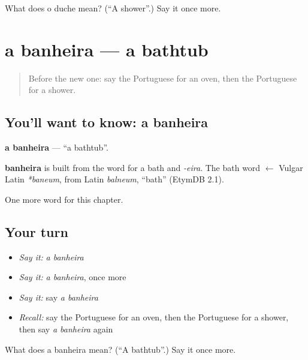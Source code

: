 \begin{tcolorbox}[breakable,colback=teal!4,colframe=teal!35!black,title={Before you move on}]
What does o duche mean? (\textquotedblleft{}A shower\textquotedblright{}.) Say it once more.
\end{tcolorbox}
\section[a banheira]{a banheira — a bathtub}

\label{lesson:PT-C94-banheira}



\begin{quote}
Before the new one: say the Portuguese for an oven, then the Portuguese for a shower.
\end{quote}

\subsection*{You'll want to know: a banheira}
\textbf{a banheira} — \textquotedblleft{}a bathtub\textquotedblright{}.

\begin{cousinweb}
\textbf{banheira} is built from the word for a bath and \emph{-eira}. The bath word $\leftarrow$ Vulgar Latin \emph{*baneum}, from Latin \emph{balneum}, \textquotedblleft{}bath\textquotedblright{} (EtymDB 2.1).
\end{cousinweb}

\begin{grammarlens}[title={What you've built}]
One more word for this chapter.
\end{grammarlens}

\subsection*{Your turn}
\begin{itemize}
\raggedright
  \item \emph{Say it:} \emph{a banheira}
  \item \emph{Say it:} \emph{a banheira}, once more
  \item \emph{Say it:} say \emph{a banheira}
  \item \emph{Recall:} say the Portuguese for an oven, then the Portuguese for a shower, then say \emph{a banheira} again
\end{itemize}

\begin{tcolorbox}[breakable,colback=teal!4,colframe=teal!35!black,title={Before you move on}]
What does a banheira mean? (\textquotedblleft{}A bathtub\textquotedblright{}.) Say it once more.
\end{tcolorbox}
